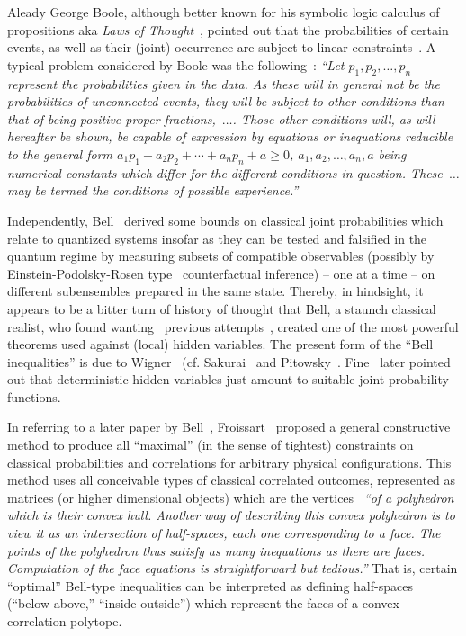 \documentclass[%
  twocolumn,
 showpacs,
 showkeys,
 preprintnumbers,
 amsmath,amssymb,
 aps,
  pra,
  longbibliography,
 floatfix,
 ]{revtex4-1}
\begin{document}
Aleady George Boole, although better known for his symbolic logic calculus of propositions aka {\em Laws of Thought}~\cite{Boole},
pointed out that the  probabilities of certain events,
as well as their (joint) occurrence  are subject to linear
constraints~\cite{Boole,Boole-62,Frechet1935,Hailperin-1965,Hailperin-86,Beltrametti-1991,Pykacz-1991,Pulmannova-1992,Beltrametti-1993,Beltrametti-1994,DvurLaen-1994,Beltrametti1995,Beltrametti-1995,Noce-1995,Laenger1995,DvurLaen-1995,DvurLaen-1995b,Beltrametti-1996,Pulmannova-2002}.
A typical problem considered by Boole was the following~\cite[p.~229]{Boole-62}:
{\em ``Let $p_1, p_2,\ldots , p_n$ represent the probabilities given in the data. As
these will in general not be the probabilities of unconnected events, they will be subject
to other conditions than that of being positive proper fractions,~$\ldots$.
Those other conditions will, as will hereafter be shown, be capable of expression by
equations or inequations reducible to the general form
$a_1 p_1 + a_2p_2 + \cdots + a_n p_n +a \ge 0$,
$a_1, a_2, \ldots , a_n, a$ being numerical constants which differ for the different conditions in
question. These~$\ldots$ may be termed the conditions of possible
experience.''}

Independently,
Bell~\cite{bell} derived some bounds on classical joint probabilities
which relate to quantized systems insofar as they can be tested and falsified in the quantum regime by measuring subsets
of compatible observables
(possibly by Einstein-Podolsky-Rosen type~\cite{epr} counterfactual inference) -- one at a time --
on different subensembles
prepared in the same state.
Thereby, in hindsight, it appears to be a bitter turn of history of thought that Bell, a staunch classical realist, who
found wanting~\cite{bell-66} previous attempts~\cite{v-neumann-49,v-neumann-55},
created one of the most powerful theorems used against (local) hidden variables.
The present form of the ``Bell inequalities'' is due to Wigner~\cite{wigner-70} (cf. Sakurai~\cite[p.~241-243]{Sakurai-1994} and  Pitowsky~\cite[Footnote~13]{pitowsky-89a}.
Fine~\cite{Fine-82} later pointed out that deterministic hidden variables
just amount to suitable joint probability functions.

In referring to a later paper by Bell~\cite{Bell-71}, Froissart~\cite{froissart-81,cirelson}
proposed a general constructive method to produce all ``maximal'' (in the sense of tightest)
constraints on classical probabilities and correlations for arbitrary physical configurations.
This method uses all conceivable types of classical correlated outcomes, represented as matrices (or higher dimensional objects)
which are the vertices~\cite[p.~243]{froissart-81}  {\em ``of a polyhedron which is their convex hull.
Another way of describing this convex polyhedron is to view it as an intersection
of half-spaces, each one corresponding to a face. The points of the
polyhedron thus satisfy as many inequations as there are faces. Computation
of the face equations is straightforward but tedious.''}
That is, certain ``optimal'' Bell-type inequalities can be interpreted as
defining half-spaces (``below-above,'' ``inside-outside'')
which represent the faces of a convex correlation polytope.
\end{document}
